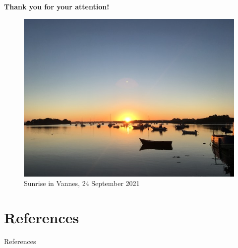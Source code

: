\documentclass{beamer}
\begin{document}
\begin{frame}
  \vspace{0.5cm}
  \centering \Large
  \textbf{{Thank you for your attention!}}

  \vspace{0.3cm}
  \begin{figure}
    \includegraphics[scale=0.35]{OT_new/sunrise_vannes.jpg}
    \caption{Sunrise in Vannes, 24 September 2021}
    \label{fig1}
  \end{figure}
\end{frame}

\section*{References}
\begin{frame}[allowframebreaks]{References}
\printbibliography
\end{frame}
\end{document}
